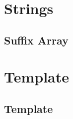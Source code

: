 \documentclass{article}
\newcommand\includes[2]{ %
   \subsection{#1}
   
}
\begin{document}
\begin{multicols}{2}
\section{Strings}
\includes{Suffix Array}{Materiais/Strings/suffix_array.cpp}
\section{Template}
\includes{Template}{Materiais/Template/template.cpp}

\end{multicols}
\end{document}
